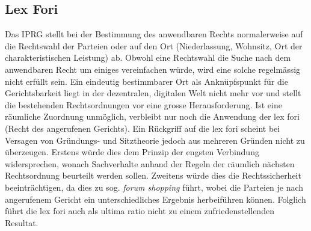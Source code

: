 \documentclass[a4paper,12pt]{report}
\begin{document}
	\subsection{Lex Fori}
	\startsubsection
    Das IPRG stellt bei der Bestimmung des anwendbaren Rechts normalerweise auf die Rechtswahl der Parteien oder auf den Ort (Niederlassung, Wohnsitz, Ort der charakteristischen Leistung) ab. Obwohl eine Rechtswahl die Suche nach dem anwendbaren Recht um einiges vereinfachen würde, wird eine solche regelmässig nicht erfüllt sein. Ein eindeutig bestimmbarer Ort als Anknüpfspunkt für die Gerichtsbarkeit liegt in der dezentralen, digitalen Welt nicht mehr vor und stellt die bestehenden Rechtsordnungen vor eine grosse Herausforderung. Ist eine räumliche Zuordnung unmöglich, verbleibt nur noch die Anwendung der lex fori (Recht des angerufenen Gerichts). Ein Rückgriff auf die lex fori scheint bei Versagen von Gründungs- und Sitztheorie jedoch aus mehreren Gründen nicht zu überzeugen. Erstens würde dies dem Prinzip der engsten Verbindung widersprechen, wonach Sachverhalte anhand der Regeln der räumlich nächsten Rechtsordnung beurteilt werden sollen. Zweitens würde dies die Rechtssicherheit beeinträchtigen, da dies zu sog. \textit{forum shopping} führt, wobei die Parteien je nach angerufenem Gericht ein unterschiedliches Ergebnis herbeiführen können. Folglich führt die lex fori auch als ultima ratio nicht zu einem zufriedenstellenden Resultat.
    \closesection
    
\end{document}
